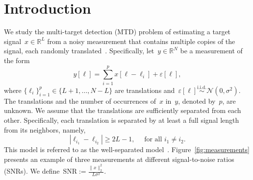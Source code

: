 \documentclass{article}
\begin{document}
\section{Introduction}
\label{sec:intro}
We study the multi-target detection (MTD) problem of estimating a target signal~$x \in \mathbb{R}^L$ from a noisy measurement that contains multiple copies of the signal, each randomly translated~\cite{bendory2019multi,lan2020multi,marshall2020image,bendory2021multi,kreymer2021two,bendory2018toward}. Specifically, let~$y \in \mathbb{R}^N$ be a measurement of the form
\begin{equation}
\label{eq:model}
y[\ell] = \sum_{i=1}^{p} x[\ell - \ell_i] + \varepsilon[\ell],
\end{equation}
where \mbox{$\{\ell_i\}_{i=1}^{p} \in \{L + 1, \ldots, N-L\}$} are translations  and~$\varepsilon[\ell]\overset{\text{i.i.d.}}{\sim} \mathcal{N}(0,\sigma^2)$. The translations and the number of occurrences of~$x$ in~$y$, denoted by~$p$, are unknown. {We assume that the translations are sufficiently separated from each other. Specifically}, each translation is separated by at least a full signal length from its neighbors, {namely},
\begin{equation}
	\label{eq:sep}
	|\ell_{i_1} - \ell_{i_2}| \ge 2L - 1, \quad \text{ for all } i_1 \ne i_2.
\end{equation}
{This model is referred to as the well-separated model~\cite{bendory2019multi}}. Figure~\ref{fig:measurements} presents an example of three  measurements at different signal-to-noise ratios (SNRs). We define~\mbox{$\text{SNR} := \frac{\|x\|_2^2}{L \sigma^2}$}.
\end{document}

